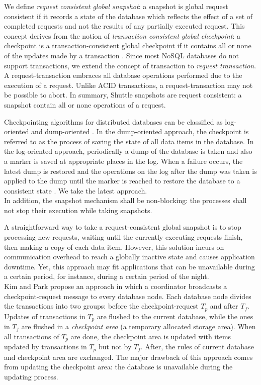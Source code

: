 We define \textit{request consistent global snapshot}: a snapshot is global request consistent if it records a state of the database which reflects the effect of a set of completed requests and not the results of any partially executed request. This concept derives from the notion of \emph{transaction consistent global checkpoint}: a checkpoint is a transaction-consistent global checkpoint if it contains all or none of the updates made by a transaction \cite{global-checkpoint}. Since most \acs{NoSQL} databases do not support transactions, we extend the concept of transaction to \textit{request transaction}. A request-transaction embraces all database operations performed due to the execution of a request. Unlike \ac{ACID} transactions, a request-transaction may not be possible to abort. In summary, Shuttle snapshots are request consistent: a snapshot contain all or none operations of a request.


Checkpointing algorithms for distributed databases can be classified as log-oriented and dump-oriented \cite{checkpoint-survey}. In the dump-oriented approach, the checkpoint is referred to as the process of saving the state of all data items in the database. In the log-oriented approach, periodically a dump of the database is taken and also a marker is saved at appropriate places in the log. When a failure occurs, the latest dump is restored and the operations on the log after the dump was taken is applied to the dump until the marker is reached to restore the database to a consistent state \cite{global-checkpoint}. We take the latest approach.\\


In addition, the snapshot mechanism shall be non-blocking: the processes shall not stop their execution while taking snapshots.  

A straightforward way to take a request-consistent global snapshot is to stop processing new requests, waiting until the currently executing requests finish, then making a copy of each data item. However, this solution incurs on communication overhead to reach a globally inactive state and causes application downtime. Yet, this approach may fit applications that can be unavailable during a certain period, for instance, during a certain period of the night. \\


Kim and Park \cite{kim_checkpoint} propose an approach in which a coordinator broadcasts a checkpoint-request message to every database node. Each database node divides the transactions into two groups: before the checkpoint-request $T_p$ and after $T_f$. Updates of transactions in $T_p$ are flushed to the current database, while the ones in $T_f$ are flushed in a \emph{checkpoint area} (a temporary allocated storage area). When all transactions of $T_p$ are done, the checkpoint area is updated with items updated by transactions in $T_p$ but not by $T_f$. After, the rules of current database and checkpoint area are exchanged. The major drawback of this approach comes from updating the checkpoint area: the database is unavailable during the updating process.


